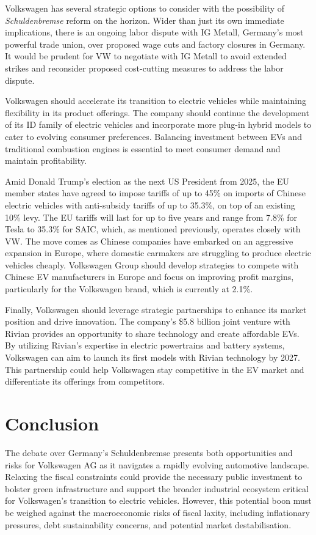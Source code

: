 \documentclass[10pt]{article}
\begin{document}
Volkswagen has several strategic options to consider with the possibility of \textit{Schuldenbremse} reform on the horizon. Wider than just its own immediate implications, there is an ongoing labor dispute with IG Metall, Germany's most powerful trade union, over proposed wage cuts and factory closures in Germany. It would be prudent for VW to negotiate with IG Metall to avoid extended strikes and reconsider proposed cost-cutting measures to address the labor dispute.


Volkswagen should accelerate its transition to electric vehicles while maintaining flexibility in its product offerings. The company should continue the development of its ID family of electric vehicles and incorporate more plug-in hybrid models to cater to evolving consumer preferences. Balancing investment between EVs and traditional combustion engines is essential to meet consumer demand and maintain profitability\autocite{VolkswagensEarningsDisappoint09:07:19+01:00}.

Amid Donald Trump's election as the next US President from 2025, the EU member states have agreed to impose tariffs of up to 45\% on imports of Chinese electric vehicles with anti-subsidy tariffs of up to 35.3\%, on top of an existing 10\% levy. The EU tariffs will last for up to five years and range from 7.8\% for Tesla to 35.3\% for SAIC, which, as mentioned previously, operates closely with VW.\@
The move comes as Chinese companies have embarked on an aggressive expansion in Europe, where domestic carmakers are struggling to produce electric vehicles cheaply. Volkswagen Group should develop strategies to compete with Chinese EV manufacturers in Europe and focus on improving profit margins, particularly for the Volkswagen brand, which is currently at 2.1\%\autocite{inagakiEUMemberStates2024}.

Finally, Volkswagen should leverage strategic partnerships to enhance its market position and drive innovation. The company's \$5.8 billion joint venture with Rivian provides an opportunity to share technology and create affordable EVs. By utilizing Rivian's expertise in electric powertrains and battery systems, Volkswagen can aim to launch its first models with Rivian technology by 2027. This partnership could help Volkswagen stay competitive in the EV market and differentiate its offerings from competitors\autocite{VolkswagenRivianLaunch}.

\section{Conclusion}
The debate over Germany's Schuldenbremse presents both opportunities and risks for Volkswagen AG as it navigates a rapidly evolving automotive landscape. Relaxing the fiscal constraints could provide the necessary public investment to bolster green infrastructure and support the broader industrial ecosystem critical for Volkswagen's transition to electric vehicles. However, this potential boon must be weighed against the macroeconomic risks of fiscal laxity, including inflationary pressures, debt sustainability concerns, and potential market destabilisation.
\end{document}
